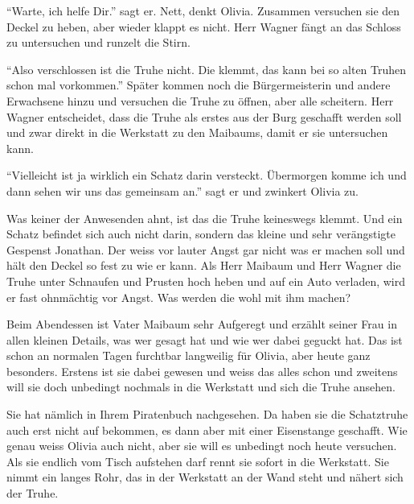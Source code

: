 \enquote{Warte, ich helfe Dir.} sagt er. Nett, denkt Olivia. Zusammen versuchen sie den Deckel zu heben, aber wieder klappt es nicht. Herr Wagner fängt an das Schloss zu untersuchen und runzelt die Stirn.

\enquote{Also verschlossen ist die Truhe nicht. Die klemmt, das kann bei so alten Truhen schon mal vorkommen.} Später kommen noch die Bürgermeisterin und andere Erwachsene hinzu und versuchen die Truhe zu öffnen, aber alle scheitern. Herr Wagner entscheidet, dass die Truhe als erstes aus der Burg geschafft werden soll und zwar direkt in die Werkstatt zu den Maibaums, damit er sie untersuchen kann.

\enquote{Vielleicht ist ja wirklich ein Schatz darin versteckt. Übermorgen komme ich und dann sehen wir uns das gemeinsam an.} sagt er und zwinkert Olivia zu. 

Was keiner der Anwesenden ahnt, ist das die Truhe keineswegs klemmt. Und ein Schatz befindet sich auch nicht darin, sondern das kleine und sehr verängstigte Gespenst Jonathan. Der weiss vor lauter Angst gar nicht was er machen soll und hält den Deckel so fest zu wie er kann. Als Herr Maibaum und Herr Wagner die Truhe unter Schnaufen und Prusten hoch heben und auf ein Auto verladen, wird er fast ohnmächtig vor Angst. Was werden die wohl mit ihm machen?

Beim Abendessen ist Vater Maibaum sehr Aufgeregt und erzählt seiner Frau in allen kleinen Details, was wer gesagt hat und wie wer dabei geguckt hat. Das ist schon an normalen Tagen furchtbar langweilig für Olivia, aber heute ganz besonders. Erstens ist sie dabei gewesen und weiss das alles schon und zweitens will sie doch unbedingt nochmals in die Werkstatt und sich die Truhe ansehen. 

Sie hat nämlich in Ihrem Piratenbuch nachgesehen. Da haben sie die Schatztruhe auch erst nicht auf bekommen, es dann aber mit einer Eisenstange geschafft. Wie genau weiss Olivia auch nicht, aber sie will es unbedingt noch heute versuchen. Als sie endlich vom Tisch aufstehen darf rennt sie sofort in die Werkstatt. Sie nimmt ein langes Rohr, das in der Werkstatt an der Wand steht und nähert sich der Truhe.

